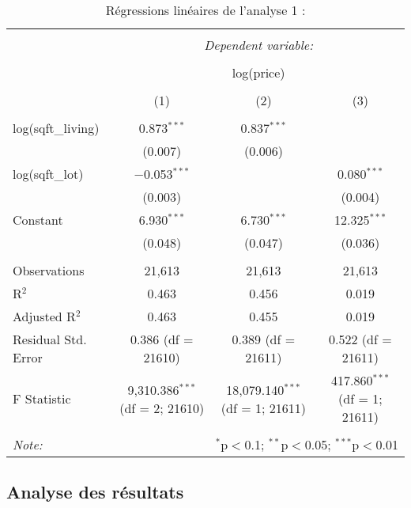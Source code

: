 \documentclass[
  11pt,
  french,
]{article}
\begin{document}
\begin{table}[!htbp] \centering 
  \caption{Régressions linéaires de l'analyse 1 :} 
  \label{} 
\small 
\begin{tabular}{@{\extracolsep{1pt}}lccc} 
\\[-1.8ex]\hline 
\hline \\[-1.8ex] 
 & \multicolumn{3}{c}{\textit{Dependent variable:}} \\ 
\cline{2-4} 
\\[-1.8ex] & \multicolumn{3}{c}{log(price)} \\ 
\\[-1.8ex] & (1) & (2) & (3)\\ 
\hline \\[-1.8ex] 
 log(sqft\_living) & 0.873$^{***}$ & 0.837$^{***}$ &  \\ 
  & (0.007) & (0.006) &  \\ 
  log(sqft\_lot) & $-$0.053$^{***}$ &  & 0.080$^{***}$ \\ 
  & (0.003) &  & (0.004) \\ 
  Constant & 6.930$^{***}$ & 6.730$^{***}$ & 12.325$^{***}$ \\ 
  & (0.048) & (0.047) & (0.036) \\ 
 \hline \\[-1.8ex] 
Observations & 21,613 & 21,613 & 21,613 \\ 
R$^{2}$ & 0.463 & 0.456 & 0.019 \\ 
Adjusted R$^{2}$ & 0.463 & 0.455 & 0.019 \\ 
Residual Std. Error & 0.386 (df = 21610) & 0.389 (df = 21611) & 0.522 (df = 21611) \\ 
F Statistic & 9,310.386$^{***}$ (df = 2; 21610) & 18,079.140$^{***}$ (df = 1; 21611) & 417.860$^{***}$ (df = 1; 21611) \\ 
\hline 
\hline \\[-1.8ex] 
\textit{Note:}  & \multicolumn{3}{r}{$^{*}$p$<$0.1; $^{**}$p$<$0.05; $^{***}$p$<$0.01} \\ 
\end{tabular} 
\end{table}

\newpage

\hypertarget{analyse-des-ruxe9sultats}{%
\subsection{Analyse des résultats}\label{analyse-des-ruxe9sultats}}
\end{document}
